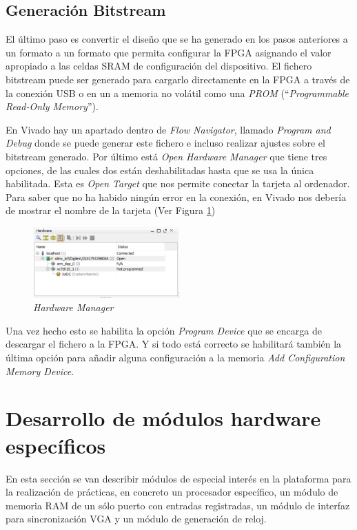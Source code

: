 \subsection{Generación Bitstream}

El último paso es convertir el diseño que se ha generado en los pasos anteriores a un formato a un formato que 
permita configurar la FPGA asignando el valor apropiado a las celdas SRAM de configuración del dispositivo. 
El fichero bitstream puede ser generado para cargarlo directamente en la FPGA a través de 
la conexión USB o en un a memoria no volátil como una \textit{PROM} (``\textit{Programmable Read-Only Memory}'').

En Vivado hay un apartado dentro de \textit{Flow Navigator}, llamado \textit{Program and Debug} donde se puede 
generar este fichero e incluso realizar ajustes sobre el bitstream generado. Por último está \textit{Open Hardware Manager} 
que tiene tres opciones, de las cuales dos están deshabilitadas hasta que se usa la única habilitada. Esta es 
\textit{Open Target} que nos permite conectar la tarjeta al ordenador. Para saber que no ha habido ningún error 
en la conexión, en Vivado nos debería de mostrar el nombre de la tarjeta (Ver Figura \ref{hardware})

\begin{figure}[H]
    \centering
    \includegraphics[width = 0.5\textwidth]{imagenes/hardware.png}
    \caption{\textit{Hardware Manager}}\label{hardware}
\end{figure}

Una vez hecho esto se habilita la opción \textit{Program Device} que se encarga de descargar el fichero a la 
FPGA. Y si todo está correcto se habilitará también la última opción para añadir alguna configuración a 
la memoria \textit{Add Configuration Memory Device}.

\section{Desarrollo de módulos hardware específicos}

En esta sección se van describir módulos de especial interés en la plataforma para la realización de prácticas, en concreto un
procesador específico, un módulo de memoria RAM de un sólo puerto con entradas registradas, un módulo de interfaz para sincronización 
VGA y un módulo de generación de reloj.


